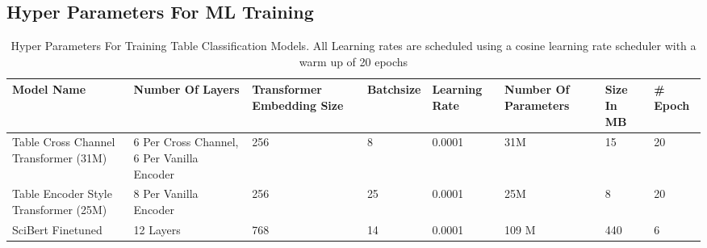 \subsection{Hyper Parameters For ML Training}
\begin{table}
  \label{table\arabic{tablecounter}}
  \centering
  \begin{tabular}{|p{2cm}|p{3cm}|p{2cm}|p{2cm}|p{1.5cm}|p{1.5cm}|p{1cm}|p{1cm}|}
  \hline
      Model Name & Number Of Layers & Transformer Embedding Size & Batchsize & Learning Rate & Number Of Parameters & Size In MB & \# Epoch\\ \hline
      Table Cross Channel Transformer (31M) & 6 Per Cross Channel, 6 Per Vanilla Encoder & 256 & 8 & 0.0001 & 31M & 15 & 20\\ \hline
      Table Encoder Style Transformer (25M) & 8 Per Vanilla Encoder & 256 & 25 & 0.0001 & 25M & 8 & 20\\ \hline
      SciBert Finetuned & 12 Layers & 768 & 14 & 0.0001 & 109 M & 440 & 6 \\ \hline
  \end{tabular}
  \caption{\label{tablecounter} Hyper Parameters For Training Table Classification Models. All Learning rates are scheduled using a cosine learning rate scheduler with a warm up of 20 epochs }
\end{table}
